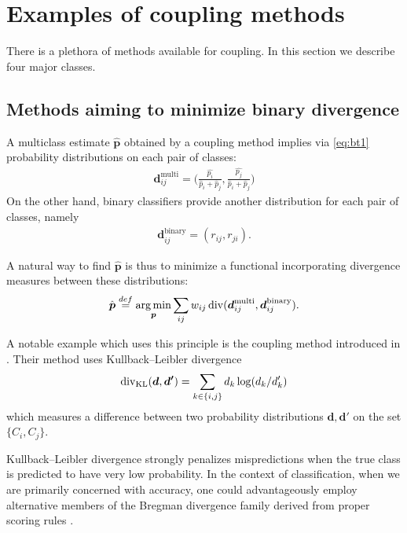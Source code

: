 

\section{Examples of coupling methods} \label{sec:coupling}

There is a plethora of methods available for coupling. In this section we describe four major classes.

\subsection{Methods aiming to minimize binary divergence}

A multiclass estimate $\hat{\boldsymbol{p}}$ obtained by a coupling method implies via \eqref{eq:bt1} probability distributions on each pair of classes:
\begin{align*}
	\boldsymbol{d}_{ij}^\textrm{multi}= \biggl(\frac{\hat{p_i}}{\hat p_i + \hat p_j},\frac{\hat{p_j}}{\hat p_i + \hat p_j}\biggr)	
\end{align*}
On the other hand, binary classifiers provide another distribution for each pair of  classes, namely
\begin{align*}
\boldsymbol{d}_{ij}^\textrm{binary} = ( r_{ij},  r_{ji}).
\end{align*}

A natural way to find  $\hat{\boldsymbol{p}}$ is thus to minimize a functional incorporating divergence measures between these distributions:
\begin{align*}
\hat{\boldsymbol{p}} \stackrel{def}{=} \operatorname*{arg\,min}_{\boldsymbol{p}} \sum_{ij} w_{ij} \operatorname*{div} (\boldsymbol{d}_{ij}^\textrm{multi}, \boldsymbol{d}_{ij}^\textrm{binary}).
\end{align*}

A notable example which uses this principle is the coupling method introduced in \cite{hastie1998classification}. Their method uses Kullback--Leibler divergence 
\begin{align*}
	\operatorname*{div}\nolimits_\textrm{KL} (\boldsymbol{d}, \boldsymbol{d'})= 
	  \sum_{k\in\{i,j\}} d_k \log (d_k/ d'_k)
\end{align*}
which measures a difference between two probability distributions $\boldsymbol{d}, \boldsymbol{d'}$ on the set $\{C_i, C_j\}$. 

Kullback--Leibler divergence strongly penalizes  mispredictions when the true class is predicted to have very low probability. In the context of classification, when we are primarily concerned with accuracy, one could advantageously employ alternative members of the Bregman divergence family derived from proper scoring rules \cite{gneiting2007strictly, buja2005loss}.
 
